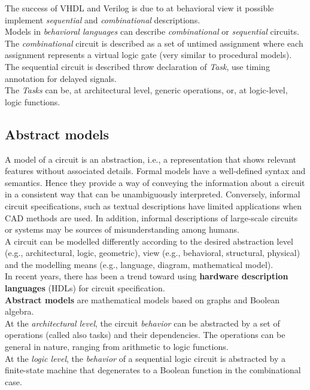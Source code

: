 The success of VHDL and Verilog is due to at behavioral view it possible implement \textit{sequential} and \textit{combinational} descriptions.\\
Models in \textit{behavioral languages} can describe \textit{combinational} or \textit{sequential} circuits.\\
The \textit{combinational} circuit is described as a set of untimed assignment where each assignment represents a virtual logic gate (very similar to procedural models).\\
The sequential circuit is described throw declaration of \textit{Task}, use timing annotation for delayed signals. \\
The \textit{Tasks} can be, at architectural level, generic operations, or, at logic-level, logic functions.

\subsection{Abstract models}
A  model of a circuit is an abstraction, i.e., a representation that shows relevant features without associated details. Formal models have a well-defined syntax and semantics. Hence they provide a way of conveying the information about a circuit in a consistent way that can be unambiguously interpreted. Conversely, informal circuit specifications, such as textual descriptions have limited applications when  CAD  methods are used. In addition, informal descriptions of large-scale circuits or systems may be sources of misunderstanding among humans.\\
A circuit can be modelled differently according to the desired abstraction level (e.g., architectural, logic, geometric), view (e.g., behavioral, structural, physical) and the modelling means (e.g., language, diagram, mathematical model).\\
In recent years, there has been a trend toward using \textbf{hardware description languages} (HDLs) for circuit specification.\\
\textbf{Abstract models} are mathematical models based on graphs and Boolean algebra.\\
At the \textit{architectural level}, the circuit \textit{behavior} can be abstracted by a set of operations (called also tasks) and their dependencies. The operations can be general in nature, ranging from arithmetic to logic functions.\\
At the \textit{logic level}, the \textit{behavior} of a sequential logic circuit is abstracted by a finite-state machine that degenerates to a Boolean function in the  combinational case.\\

